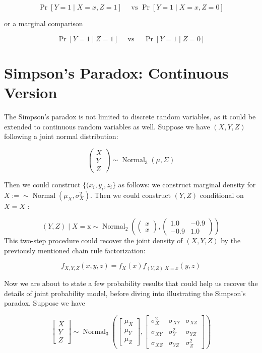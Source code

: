 \documentclass[
]{book}
\begin{document}
\[ 
\operatorname{Pr}[Y=1 \mid X=x, Z=1] \quad \text { vs } \operatorname{Pr}[Y=1 \mid X=x, Z=0]
\]

or a marginal comparison

\[
\operatorname{Pr}[Y=1 \mid Z=1] \quad \text { vs } \quad \operatorname{Pr}[Y=1 \mid Z=0]
\]

\hypertarget{simpsons-paradox-continuous-version}{%
\section{Simpson's Paradox: Continuous Version}\label{simpsons-paradox-continuous-version}}

The Simpson's paradox is not limited to discrete random variables, as it could be extended to continuous random variables as well. Suppose we have \((X,Y,Z)\) following a joint normal distribution:

\[
\left(\begin{array}{l}
X \\
Y \\
Z
\end{array}\right) \sim \operatorname{Normal}_3(\mu, \Sigma)
\]

Then we could construct \(\{ (x_i,y_i,z_i \}\) as follows: we construct marginal density for \(X:= \sim \operatorname{Normal}\left(\mu_X, \sigma_X^2\right)\). Then we could construct \((Y, Z)\) conditional on \(X=X\) :

\[
(Y, Z) \mid X=\mathrm{x} \sim \operatorname{Normal}_2\left(\left(\begin{array}{l}
x \\
x
\end{array}\right),\left(\begin{array}{cc}
1.0 & -0.9 \\
-0.9 & 1.0
\end{array}\right)\right)
\] This two-step procedure could recover the joint density of \((X,Y,Z)\) by the previously mentioned chain rule factorization:

\[ f_{X,Y,Z}(x,y,z) = f_{X}(x) f_{(Y,Z)|X=x}(y,z) \]

Now we are about to state a few probability results that could help us recover the details of joint probability model, before diving into illustrating the Simpson's paradox. Suppose we have

\[
\left[\begin{array}{c}
X \\
Y \\
Z
\end{array}\right] \sim \operatorname{Normal}_3\left(\left[\begin{array}{l}
\mu_X \\
\mu_Y \\
\mu_Z
\end{array}\right],\left[\begin{array}{ccc}
\sigma_X^2 & \sigma_{X Y} & \sigma_{X Z} \\
\sigma_{X Y} & \sigma_Y^2 & \sigma_{Y Z} \\
\sigma_{X Z} & \sigma_{Y Z} & \sigma_Z^2
\end{array}\right]\right)
\]
\end{document}
